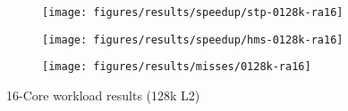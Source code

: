 \begin{figure}
    \centering
    \begin{subfigure}[b]{\textwidth}
            \texttt{[image: figures/results/speedup/stp-0128k-ra16]}
            \label{fig:results:4core:hms:random}
    \end{subfigure}

    \begin{subfigure}[b]{\textwidth}
            \texttt{[image: figures/results/speedup/hms-0128k-ra16]}
            \label{fig:results:4core:hms:cache}
    \end{subfigure}
    \begin{subfigure}[b]{\textwidth}
            \texttt{[image: figures/results/misses/0128k-ra16]}
            \label{fig:results:4core:hms:cache-bw}
    \end{subfigure}

    \caption{16-Core workload results (128k L2)}\label{fig:results:4core:hms}
\end{figure}
